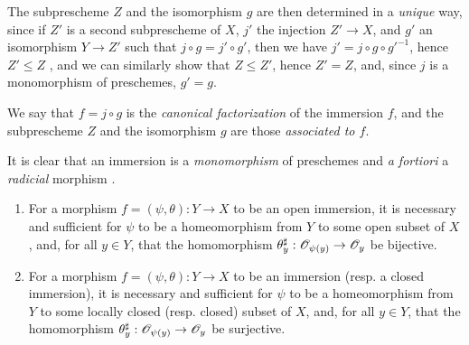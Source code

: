The subprescheme $Z$ and the isomorphism $g$ are then determined in a \emph{unique} way, since if $Z'$ is a second subprescheme of $X$, $j'$ the injection $Z'\to X$, and $g'$ an isomorphism $Y\to Z'$ such that $j\circ g=j'\circ g'$, then we have $j'=j\circ g\circ{g'}^{-1}$, hence $Z'\leqslant Z$ , and we can similarly show that $Z\leqslant Z'$, hence $Z'=Z$, and, since $j$ is a monomorphism of preschemes, $g'=g$.

We say that $f=j\circ g$ is the \emph{canonical factorization} of the immersion $f$, and the subprescheme $Z$ and the isomorphism $g$ are those \emph{associated to $f$}.

It is clear that an immersion is a \emph{monomorphism} of preschemes  and \emph{a fortiori} a \emph{radicial} morphism .

\begin{prop}[4.2.2]
\label{1.4.2.2}
\medskip\noindent
\begin{enumerate}[label={\rm(\alph*)}]
  \item For a morphism $f=(\psi,\theta):Y\to X$ to be an open immersion, it is necessary and sufficient for $\psi$ to be a homeomorphism from $Y$ to some open subset of $X$, and, for all $y\in Y$, that the homomorphism $\theta_y^\sharp:\OO_{\psi(y)}\to\OO_y$ be bijective.
  \item For a morphism $f=(\psi,\theta):Y\to X$ to be an immersion (resp. a closed immersion), it is necessary and sufficient for $\psi$ to be a homeomorphism from $Y$ to some locally closed (resp. closed) subset of $X$, and, for all $y\in Y$, that the homomorphism $\theta_y^\sharp:\OO_{\psi(y)}\to\OO_y$ be surjective.
\end{enumerate}
\end{prop}

